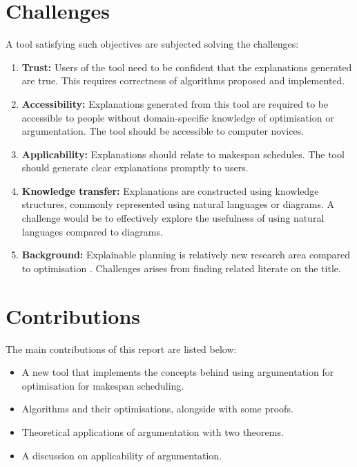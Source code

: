 \section{Challenges}

A tool satisfying such objectives are subjected solving the challenges:
\begin{enumerate}
	\item\textbf{Trust:} Users of the tool need to be confident that the explanations generated are true. This requires correctness of algorithms proposed and implemented.
	\item\textbf{Accessibility:} Explanations generated from this tool are required to be accessible to people without domain-specific knowledge of optimisation or argumentation. The tool should be accessible to computer novices.
	\item\textbf{Applicability:} Explanations should relate to makespan schedules. The tool should generate clear explanations promptly to users.
	\item\textbf{Knowledge transfer:} Explanations are constructed using knowledge structures, commonly represented using natural languages or diagrams. A challenge would be to effectively explore the usefulness of using natural languages compared to diagrams.
	\item\textbf{Background:} Explainable planning is relatively new research area compared to optimisation \cite{pe}. Challenges arises from finding related literate on the title.
\end{enumerate}

\section{Contributions}
\label{introcontributions}

The main contributions of this report are listed below:
\begin{itemize}
	\item A new tool \emph{\toolname} that implements the concepts behind using argumentation for optimisation for makespan scheduling.
	\item Algorithms and their optimisations, alongside with some proofs.
	\item Theoretical applications of argumentation with two theorems.
	\item A discussion on applicability of argumentation.
\end{itemize}
